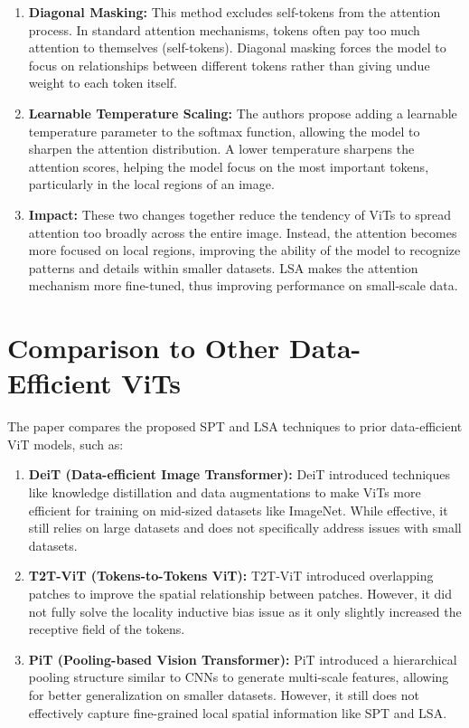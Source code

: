 \documentclass{report}
\begin{document}
	\begin{enumerate}
		\item 
		\textbf{Diagonal Masking:} This method excludes self-tokens from the attention process. In standard attention mechanisms, tokens often pay too much attention to themselves (self-tokens). Diagonal masking forces the model to focus on relationships between different tokens rather than giving undue weight to each token itself.
		
		\item 
		\textbf{Learnable Temperature Scaling:} The authors propose adding a learnable temperature parameter to the softmax function, allowing the model to sharpen the attention distribution. A lower temperature sharpens the attention scores, helping the model focus on the most important tokens, particularly in the local regions of an image.
		
		\item 
		\textbf{Impact:} These two changes together reduce the tendency of ViTs to spread attention too broadly across the entire image. Instead, the attention becomes more focused on local regions, improving the ability of the model to recognize patterns and details within smaller datasets. LSA makes the attention mechanism more fine-tuned, thus improving performance on small-scale data.
	\end{enumerate}




	\section{Comparison to Other Data-Efficient ViTs}
	The paper compares the proposed SPT and LSA techniques to prior data-efficient ViT models, such as:
	
	\begin{enumerate}
		\item 
		\textbf{DeiT (Data-efficient Image Transformer):} DeiT introduced techniques like knowledge distillation and data augmentations to make ViTs more efficient for training on mid-sized datasets like ImageNet. While effective, it still relies on large datasets and does not specifically address issues with small datasets.
		
		\item 
		\textbf{T2T-ViT (Tokens-to-Tokens ViT):} T2T-ViT introduced overlapping patches to improve the spatial relationship between patches. However, it did not fully solve the locality inductive bias issue as it only slightly increased the receptive field of the tokens.
		
		\item 
		\textbf{PiT (Pooling-based Vision Transformer):} PiT introduced a hierarchical pooling structure similar to CNNs to generate multi-scale features, allowing for better generalization on smaller datasets. However, it still does not effectively capture fine-grained local spatial information like SPT and LSA.
	\end{enumerate}
	
\end{document}

